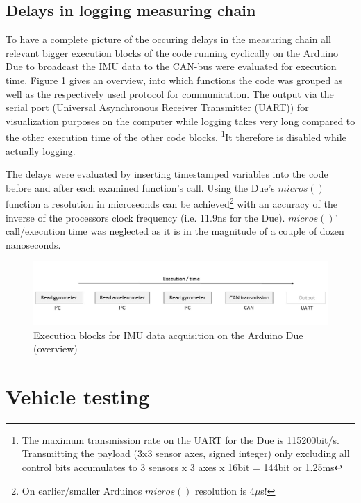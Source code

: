 \documentclass[ExampleMasters.tex]{subfiles}
\begin{document}
\subsection{Delays in logging measuring chain}
\label{sec:delays_on_arduino}

To have a complete picture of the occuring delays in the measuring chain all relevant bigger execution blocks of the code running cyclically on the Arduino Due to broadcast the IMU data to the CAN-bus were evaluated for execution time. Figure \ref{fig:arduino_delays_sketch} gives an overview, into which functions the code was grouped as well as the respectively used protocol for communication. The output via the serial port (Universal Asynchronous Receiver Transmitter (UART)) for visualization purposes on the computer while logging takes very long compared to the other execution time of the other code blocks. \footnote{The maximum transmission rate on the UART for the Due is 115200bit/s. Transmitting the payload (3x3 sensor axes, signed integer) only excluding all control bits accumulates to 3 sensors x 3 axes x 16bit = 144bit  or 1.25ms}It therefore is disabled while actually logging. 

The delays were evaluated by inserting timestamped variables into the code before and after each examined function's call. Using the Due's $micros()$ function a resolution in microseonds can be achieved\footnote{On earlier/smaller Arduinos $micros()$ resolution is 4$\mu$s!} with an accuracy of the inverse of the processors clock frequency (i.e. 11.9ns for the Due). $micros()$' call/execution time was neglected as it is in the magnitude of a couple of dozen nanoseconds.

\begin{figure}[h!]
\centering
\includegraphics[width=1\linewidth]{figures/arduino_delays_sketch}
\caption{Execution blocks for IMU data acquisition on the Arduino Due (overview)}
\label{fig:arduino_delays_sketch}
\end{figure}


\section{Vehicle testing}
\label{sec:vehicle-testing}
\end{document}
